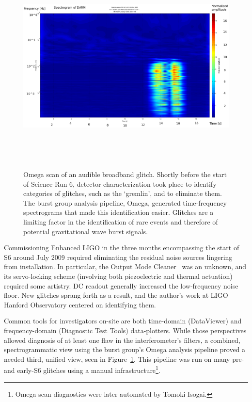 \begin{figure}
\begin{center}
\includegraphics[height=111mm, width=148mm]{aglitch928228390_new.eps} 
\caption{Omega scan of an audible broadband glitch. Shortly before the start of Science Run 6, detector characterization took place to identify categories of glitches, such as the `gremlin', and to eliminate them. The burst group analysis pipeline, Omega, generated time-frequency spectrograms that made this identification easier. Glitches are a limiting factor in the identification of rare events and therefore of potential gravitational wave burst signals.}
\label{omega_scan_audible_glitch}
\end{center}
\end{figure}

Commissioning Enhanced LIGO in the three months encompassing the start of S6 around July 2009 required eliminating the residual noise sources lingering from installation. 
In particular, the Output Mode Cleaner~\cite{SmithThesis} was an unknown, and its servo-locking scheme (involving both piezoelectric and thermal actuation) required some artistry.
DC readout generally increased the low-frequency noise floor.
New glitches sprang forth as a result, and the author's work at LIGO Hanford Observatory centered on identifying them.

Common tools for investigators on-site are both time-domain (DataViewer) and frequency-domain (Diagnostic Test Tools) data-plotters.
While those perspectives allowed diagnosis of at least one flaw in the interferometer's filters, a combined, spectrogrammatic view using the burst group's Omega analysis pipeline proved a needed third, unified view, seen in Figure~\ref{omega_scan_audible_glitch}.
This pipeline was run on many pre- and early-S6 glitches using a manual infrastructure\footnote{Omega scan diagnostics were later automated by Tomoki Isogai.}.

